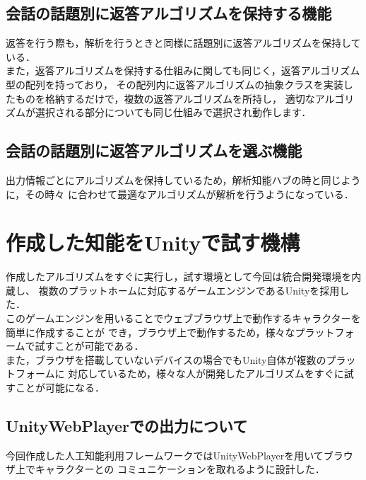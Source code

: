 \subsection{会話の話題別に返答アルゴリズムを保持する機能}
返答を行う際も，解析を行うときと同様に話題別に返答アルゴリズムを保持している．
\\
また，返答アルゴリズムを保持する仕組みに関しても同じく，返答アルゴリズム型の配列を持っており，
その配列内に返答アルゴリズムの抽象クラスを実装したものを格納するだけで，複数の返答アルゴリズムを所持し，
適切なアルゴリズムが選択される部分についても同じ仕組みで選択され動作します．\\

\subsection{会話の話題別に返答アルゴリズムを選ぶ機能}
出力情報ごとにアルゴリズムを保持しているため，解析知能ハブの時と同じように，その時々
に合わせて最適なアルゴリズムが解析を行うようになっている．


\newpage


\section{作成した知能をUnityで試す機構}
作成したアルゴリズムをすぐに実行し，試す環境として今回は統合開発環境を内蔵し、
複数のプラットホームに対応するゲームエンジンであるUnityを採用した．
\\
このゲームエンジンを用いることでウェブブラウザ上で動作するキャラクターを簡単に作成することが
でき，ブラウザ上で動作するため，様々なプラットフォームで試すことが可能である．
\\
また，ブラウザを搭載していないデバイスの場合でもUnity自体が複数のプラットフォームに
対応しているため，様々な人が開発したアルゴリズムをすぐに試すことが可能になる．
\\

\subsection{UnityWebPlayerでの出力について}
今回作成した人工知能利用フレームワークではUnityWebPlayerを用いてブラウザ上でキャラクターとの
コミュニケーションを取れるように設計した．\\


